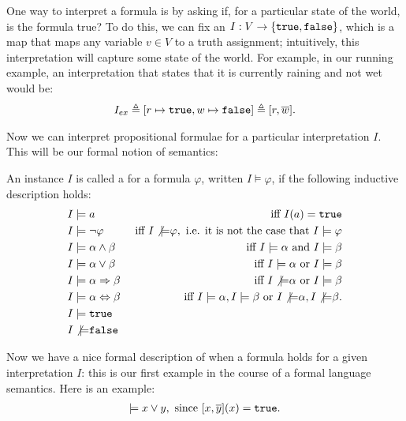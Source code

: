 \documentclass{tufte-handout}
\begin{document}
One way to interpret a formula is by asking if, for a particular state of the
world, is the formula true? To do this, we can fix an  $I : V
\rightarrow \{\texttt{true}, \texttt{false}\}$, which is a map that maps any variable $v \in V$
to a truth assignment; intuitively, this interpretation will capture some state 
of the world. For example, in our running example, an interpretation that states 
that it is currently raining and not wet would be:
\begin{align}
    I_{ex} \triangleq [r \mapsto \true, w \mapsto \false] \triangleq [r, \overline{w}].
    \label{eq:iex}
\end{align}

Now we can interpret propositional formulae for a particular interpretation $I$.
This will be our formal notion of semantics:
\begin{definition}  
    An instance $I$ is called a  for a formula $\varphi$, written $I
    \models \varphi$, if the following inductive description holds:
\begin{align*}
    I &\models a & \text{ iff } I(a) = \texttt{true} \\
    I &\models \neg \varphi & \text{ iff } I \not{\models} \varphi, \text{ i.e. it is not the case that } I \models \varphi \\
    I &\models \alpha \land \beta & \text{ iff } I \models \alpha \text{ and } I \models \beta \\
    I &\models \alpha \lor \beta & \text{ iff } I \models \alpha \text{ or } I \models \beta \\
    I &\models \alpha \Rightarrow \beta & \text{ iff } I \not{\models} \alpha \text{ or } I \models \beta \\
    I &\models \alpha \Leftrightarrow \beta & \text{ iff } I \models \alpha, I \models \beta \text{ or }  I \not{\models} \alpha, I \not{\models} \beta. \\
    I &\models \texttt{true} \\
    I &\not{\models} \texttt{false} \\
\end{align*}
\end{definition}
Now we have a nice formal description of when a formula holds for a 
given interpretation $I$: this is our first example in the course of a 
formal language semantics. Here is an example:
\begin{align*}
    [x, \overline{y}] \models x \lor y, \text{ since } [x, \overline{y}](x) = \true.
\end{align*}
\end{document}
